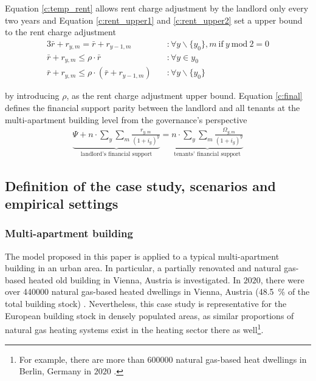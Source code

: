 Equation \ref{c:temp_rent} allows rent charge adjustment by the landlord only every two years and Equation \ref{c:rent_upper1} and \ref{c:rent_upper2} set a upper bound to the rent charge adjustment
\begin{alignat}{3}
\bar{r} + r_{y,m} = \bar{r} + r_{y-1,m} \quad &:\forall y\backslash \{y_0\},m~\text{if}~y~\text{mod}~2=0\label{c:temp_rent}\\
\bar{r}+r_{y,m} \leq \rho \cdot \bar{r} \quad &:\forall y \in {y_0}\label{c:rent_upper1}\\
\bar{r}+r_{y,m} \leq \rho \cdot \left(\bar{r}+r_{y-1,m}\right) \quad &:\forall y\backslash \{y_0\}\label{c:rent_upper2}
\end{alignat}

by introducing $\rho$, as the rent charge adjustment upper bound. Equation \ref{c:final} defines the financial support parity between the landlord and all tenants at the multi-apartment building level from the governance's perspective 
\begin{align}\label{c:final}
\underbrace{\Psi +  n \cdot \sum_{y} \sum_{m} \frac{r_{y,m}}{(1+i_{g})^y}}_{\text{landlord's financial support}}= \underbrace{n \cdot \sum_{y} \sum_{m} \frac{\Omega_{y,m}}{(1+i_{g})^y}}_{\text{tenants' financial support}}
\end{align}

\subsection{Definition of the case study, scenarios and empirical settings}\label{met:empirical}
\subsubsection{Multi-apartment building}
The model proposed in this paper is applied to a typical multi-apartment building in an urban area. In particular, a partially renovated and natural gas-based heated old building in Vienna, Austria is investigated. In $2020$, there were over \SI{440000}{} natural gas-based heated dwellings in Vienna, Austria (\SI{48.5}{\%} of the total building stock) \cite{statistikaustriaheizen}. Nevertheless, this case study is representative for the European building stock in densely populated areas, as similar proportions of natural gas heating systems exist in the heating sector there as well\footnote{For example, there are more than \SI{600000}{} natural gas-based heat dwellings in Berlin, Germany in $2020$ \cite{BDEW2019}.}.\vspace{0.5cm}

